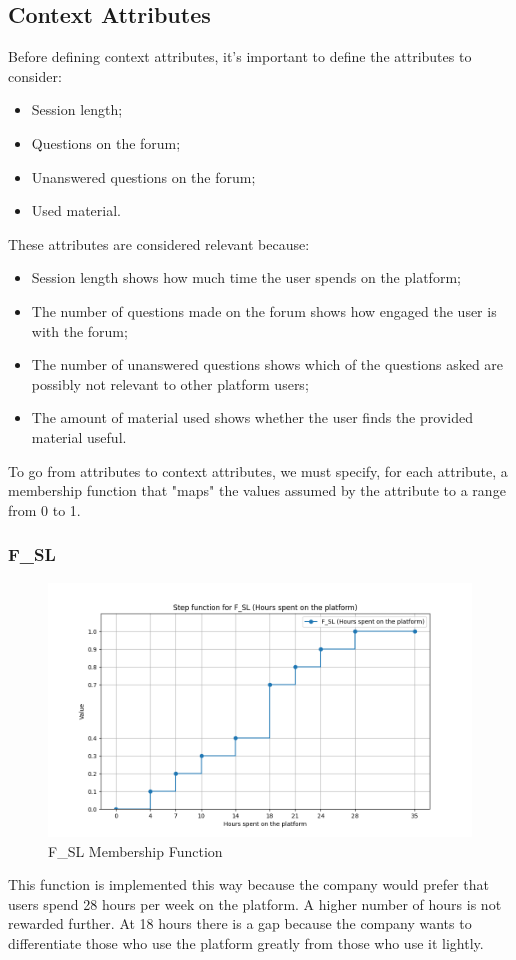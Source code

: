 \subsection{Context Attributes}
Before defining context attributes, it's important to define the attributes to consider:
\begin{itemize}
    \item Session length;
    \item Questions on the forum;
    \item Unanswered questions on the forum;
    \item Used material.
\end{itemize}
These attributes are considered relevant because:
\begin{itemize}
    \item Session length shows how much time the user spends on the platform;
    \item The number of questions made on the forum shows how engaged the user is with the forum;
    \item The number of unanswered questions shows which of the questions asked are possibly not relevant to other platform users;
    \item The amount of material used shows whether the user finds the provided material useful.
\end{itemize}

To go from attributes to context attributes, we must specify, for each attribute, a membership function that "maps" the values assumed by the attribute to a range from 0 to 1.
\subsubsection{F\_SL}
\begin{figure}[H]
    \centering
    \includegraphics[width=\textwidth]{./assets/plot_F_SL.png}
    \caption{F\_SL Membership Function}
    \label{fig:plot_F_SL}
\end{figure}
This function is implemented this way because the company would prefer that users spend 28 hours per week on the platform. A higher number of hours is not rewarded further. At 18 hours there is a gap because the company wants to differentiate those who use the platform greatly from those who use it lightly.
